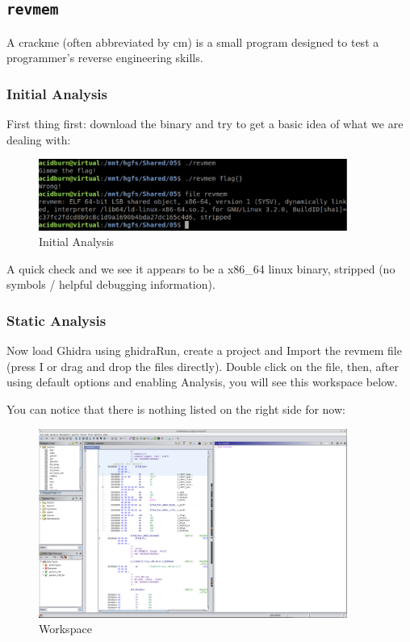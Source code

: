 \documentclass{article}
\begin{document}
\subsection{\texttt{revmem}}

A crackme (often abbreviated by cm) is a small program designed to test a programmer’s 
reverse engineering skills. 

\subsubsection{Initial Analysis}

First thing first: download the binary and try to get a basic idea of what we are dealing with:
\begin{figure}[H]
\centering
\includegraphics[width=0.9\textwidth]{img/initial.pdf}
\caption{Initial Analysis}
\label{fig:initial}
\end{figure}
\noindent\linebreak
A quick check and we see it appears to be a x86\_64 linux binary, stripped (no symbols / helpful debugging information).

\subsubsection{Static Analysis}

\noindent\linebreak
Now load Ghidra using ghidraRun, create a project and Import the revmem file (press I or drag and drop the files 
directly). Double click on the file, then, after using default options and enabling Analysis, you will see this 
workspace below.

\noindent\linebreak
You can notice that there is nothing listed on the right side for now:
\begin{figure}[H]
\centering
\includegraphics[width=0.9\textwidth]{img/ghidra_1.pdf}
\caption{Workspace}
\label{fig:ghidra_1}
\end{figure}
\end{document}
